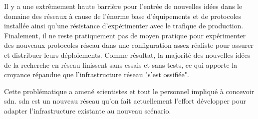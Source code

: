 
Il y a une extrêmement haute barrière pour l'entrée de nouvelles idées dans le domaine des réseaux à cause de l'énorme base d'équipements et de protocoles installée ainsi qu'une résistance d'expérimenter avec le trafique de production. Finalement, il ne reste pratiquement pas de moyen pratique pour expérimenter des nouveaux protocoles réseau dans une configuration assez réaliste pour assurer et distribuer leurs déploiements. Comme résultat, la majorité des nouvelles idées de la recherche en réseau finissent sans essais et sans tests, ce qui apporte la croyance répandue que l'infrastructure réseau "s'est ossifiée". \cite{OpenFlowStanford} \par
Cette problématique a amené scientistes et tout le personnel impliqué à concevoir \gls{sdn}. \gls{sdn} est un nouveau  réseau qu'on fait actuellement l'effort développer pour adapter l'infrastructure existante au nouveau scénario.